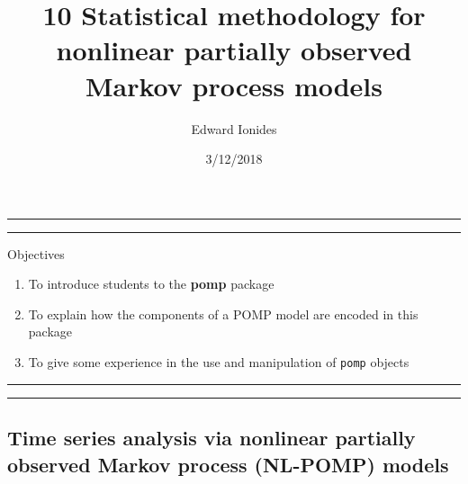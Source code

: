 \documentclass[]{article}
\title{10 Statistical methodology for nonlinear partially observed Markov
process models}
\author{Edward Ionides}
\date{3/12/2018}
\begin{document}
\maketitle

{
\setcounter{tocdepth}{2}
\tableofcontents
}
\newcommand\prob{\mathbb{P}}
\newcommand\E{\mathbb{E}}
\newcommand\var{\mathrm{Var}}
\newcommand\cov{\mathrm{Cov}}
\newcommand\loglik{\ell}
\newcommand\R{\mathbb{R}}
\newcommand\data[1]{#1^*}
\newcommand\params{\, ; \,}
\newcommand\transpose{\scriptsize{T}}
\newcommand\eqspace{\quad\quad}
\newcommand\myeq[1]{\eqspace \displaystyle #1}
\newcommand\lik{\mathscr{L}}
\newcommand\profileloglik[1]{\ell^\mathrm{profile}_#1}
\newcommand\ar{\phi}
\newcommand\ma{\psi}
\newcommand\AR{\Phi}
\newcommand\MA{\Psi}
\newcommand\ev{u}
\newcommand\given{{\, | \,}}
\newcommand\equals{{=\,}}
\newcommand\matA{\mathbb{A}}
\newcommand\matB{\mathbb{B}}
\newcommand\matH{\mathbb{H}}
\newcommand\covmatX{\mathbb{U}}
\newcommand\covmatY{\mathbb{V}}





\begin{center}\rule{0.5\linewidth}{\linethickness}\end{center}

\begin{center}\rule{0.5\linewidth}{\linethickness}\end{center}

Objectives

\begin{enumerate}
\def\labelenumi{\arabic{enumi}.}
\item
  To introduce students to the \textbf{pomp} package
\item
  To explain how the components of a POMP model are encoded in this
  package
\item
  To give some experience in the use and manipulation of \texttt{pomp}
  objects
\end{enumerate}

\begin{center}\rule{0.5\linewidth}{\linethickness}\end{center}

\begin{center}\rule{0.5\linewidth}{\linethickness}\end{center}

\subsection{Time series analysis via nonlinear partially observed Markov
process (NL-POMP)
models}\label{time-series-analysis-via-nonlinear-partially-observed-markov-process-nl-pomp-models}
\end{document}
